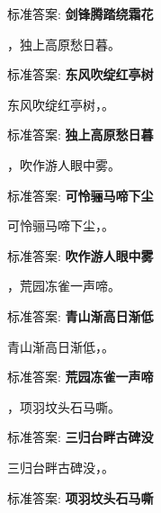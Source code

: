\documentclass[12pt, a4paper, addpoints]{exam}
\begin{document}
\begin{questions}
标准答案: \textbf{剑锋腾踏绕霜花}

\question[1] \uline{\qquad\qquad\qquad}，独上高原愁日暮。

标准答案: \textbf{东风吹绽红亭树}

\question[1] 东风吹绽红亭树，\uline{\qquad\qquad\qquad}。

标准答案: \textbf{独上高原愁日暮}

\question[1] \uline{\qquad\qquad\qquad}，吹作游人眼中雾。

标准答案: \textbf{可怜骊马啼下尘}

\question[1] 可怜骊马啼下尘，\uline{\qquad\qquad\qquad}。

标准答案: \textbf{吹作游人眼中雾}

\question[1] \uline{\qquad\qquad\qquad}，荒园冻雀一声啼。

标准答案: \textbf{青山渐高日渐低}

\question[1] 青山渐高日渐低，\uline{\qquad\qquad\qquad}。

标准答案: \textbf{荒园冻雀一声啼}

\question[1] \uline{\qquad\qquad\qquad}，项羽坟头石马嘶。

标准答案: \textbf{三归台畔古碑没}

\question[1] 三归台畔古碑没，\uline{\qquad\qquad\qquad}。

标准答案: \textbf{项羽坟头石马嘶}

\end{questions}

\hspace{5cm}
\end{document}
